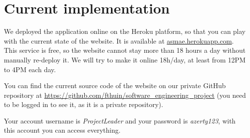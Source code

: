 \section{Current implementation}

We deployed the application online on the Heroku platform, so that you can play with the current state of the website. It is available at \url{asmae.herokuapp.com}. This
service is free, so the website cannot stay more than 18 hours a
day without manually re-deploy it. We will try to make it online 18h/day, at least from 12PM to 4PM each day.\newline

You can find the current source code of the website on our private GitHub
repository at \url{https://github.com/fthuin/software_engineering_project}
(you need to be logged in to see it, as it is a private repository).

Your account username is \textit{ProjectLeader} and your password is
\textit{azerty123}, with this account you can access everything.
